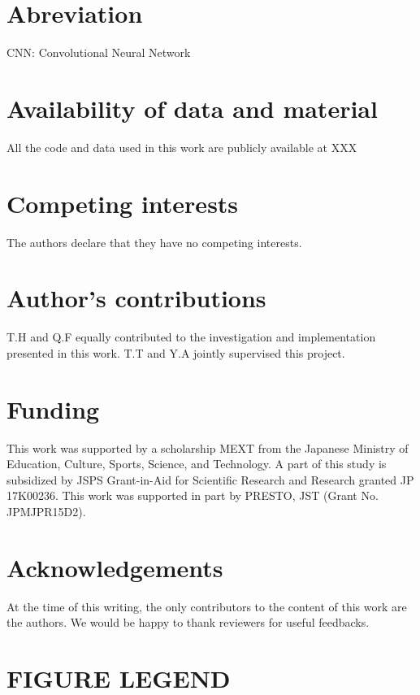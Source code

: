 \documentclass[twocolumn]{bmcart}
\begin{document}
\section*{Abreviation}

CNN: Convolutional Neural Network  \\

\begin{backmatter}
\section*{Availability of data and material}
All the code and data used in this work are publicly available at XXX

\section*{Competing interests}
The authors declare that they have no competing interests.

\section*{Author's contributions}
T.H and Q.F equally contributed to the investigation and implementation presented in this work. T.T and Y.A jointly supervised this project.

\section*{Funding}
This work was supported by a scholarship MEXT from the Japanese Ministry of Education, Culture, Sports, Science, and Technology. 
A part of this study is subsidized by JSPS Grant-in-Aid for Scientific Research and Research granted JP 17K00236. 
This work was supported in part by PRESTO, JST (Grant No. JPMJPR15D2).

\section*{Acknowledgements}
At the time of this writing, the only contributors to the content of this work are the authors. We would be happy to thank reviewers for useful feedbacks.




\section*{FIGURE LEGEND}


\end{backmatter}
\end{document}
